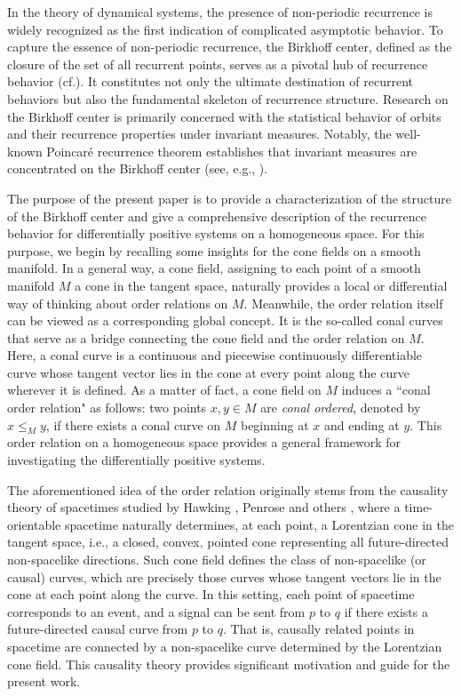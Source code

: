 \documentclass[a4paper,11pt]{article}
\theoremstyle{plain}
\theoremstyle{definition}
\numberwithin{equation}{section}
\begin{document}
In the theory of dynamical systems, the presence of non-periodic recurrence is widely recognized as the first indication of complicated asymptotic behavior. To capture the essence of non-periodic recurrence, the Birkhoff center, defined as the closure of the set of all recurrent points, serves as a pivotal hub of recurrence behavior (cf.\cite{K95,M12}). It constitutes not only the ultimate destination of recurrent behaviors but also the fundamental skeleton of recurrence structure. Research on the Birkhoff center is primarily concerned with the statistical behavior of orbits and their recurrence properties under invariant measures. Notably, the well-known Poincaré recurrence theorem establishes that invariant measures are concentrated on the Birkhoff center (see, e.g., \cite{J20,M12}). 


The purpose of the present paper is to provide a characterization of the structure of the Birkhoff center and give a comprehensive description of the recurrence behavior for differentially positive systems on a homogeneous space.
For this purpose, we begin by recalling some insights for the cone fields on a smooth manifold. In a general way, a cone field, assigning to each point of a smooth manifold $M$ a cone in the tangent space, naturally provides a local or differential way of thinking about order relations on $M$. Meanwhile, the order relation itself can be viewed as a corresponding global concept. It is the so-called conal curves that serve as a bridge connecting the cone field and the order relation on $M$. Here, a conal curve is a continuous and piecewise continuously differentiable curve whose tangent vector lies in the cone at every point along the curve wherever it is defined. As a matter of fact, a cone field on $M$ induces a ``conal order relation" as follows: two points $x,y\in M$ are {\it conal ordered}, denoted by $x\leq_M y$, if there exists a conal curve on $M$ beginning at $x$ and ending at $y$.
This order relation on a homogeneous space provides a general framework for investigating the differentially positive systems.


The aforementioned idea of the order relation originally stems from the causality theory of spacetimes studied by Hawking \cite{Hawkingandellis73}, Penrose \cite{Penrose72} and others \cite{Beemandehrlich81,Wald84}, where a time-orientable spacetime naturally determines, at each point, a Lorentzian cone in the tangent space, i.e., a closed, convex, pointed cone representing all future-directed non-spacelike directions. Such cone field defines the class of non-spacelike (or causal) curves, which are precisely those curves whose tangent vectors lie in the cone at each point along the curve.
In this setting, each point of spacetime corresponds to an event, and a signal can be sent from $p$ to $q$ if there exists a future-directed causal curve from $p$ to $q$. That is, causally related points in spacetime are connected by a non-spacelike curve determined by the Lorentzian cone field.
This causality theory provides significant motivation and guide for the present work.
\end{document}
